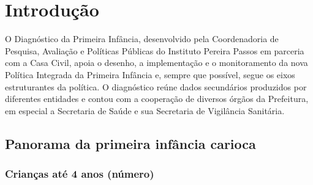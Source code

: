 
\chapter{Introdução}\label{cap:introducao}

O Diagnóstico da Primeira Infância, desenvolvido pela Coordenadoria de Pesquisa, Avaliação e Políticas Públicas do Instituto Pereira Passos em parceria com a Casa Civil, apoia o desenho, a implementação e o monitoramento da nova Política Integrada da Primeira Infância e, sempre que possível, segue os eixos estruturantes da política. O diagnóstico reúne dados secundários produzidos por diferentes entidades e contou com a cooperação de diversos órgãos da Prefeitura, em especial a Secretaria de Saúde e sua Secretaria de Vigilância Sanitária.




\section{Panorama da primeira infância carioca}\label{sec:panorama}

\subsection{Crianças até 4 anos (número)}


